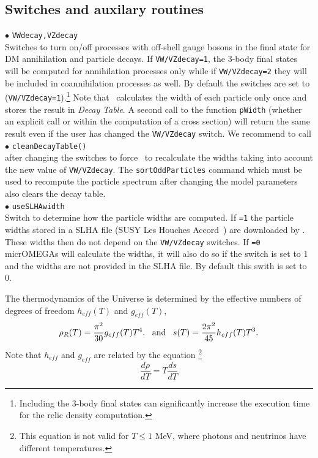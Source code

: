 \documentclass[12pt,a4paper]{article}
\begin{document}
\subsection{Switches and auxilary routines}
\label{Switches}
\noindent
$\bullet$ \verb|VWdecay,VZdecay|\\
Switches to turn on/off  processes with off-shell gauge bosons in the final state for DM annihilation and particle decays.
If \verb|VW/VZdecay=1|, the  3-body final states will be computed for annihilation processes only while 
if \verb|VW/VZdecay=2| they will be included in coannihilation processes as well.
By  default  the switches are set to (\verb|VW/VZdecay=1|).\footnote{Including the 3-body final states can significantly increase the execution time for the relic density computation.}
Note that \micro\ calculates the width of each particle only once and stores the
result in {\it Decay Table}.  A second call to the function \verb|pWidth| (whether an explicit call or within the computation of a cross section)   will return the same result  even if the user has changed the {\tt VW/VZdecay} switch.  
We recommend to call\\[2mm]
$\bullet$ \verb|cleanDecayTable()| \\
after changing the switches to force \micro\ to recalculate the widths taking into account  the new value of {\tt VW/VZdecay}.
The   {\tt sortOddParticles} command which must be used 
to recompute the particle spectrum after changing the model parameters also clears  the decay table.\\[2mm]
%
$\bullet$ \verb|useSLHAwidth|\\
Switch to  determine how the particle widths are computed. 
If {\tt =1} the particle widths  stored in  a SLHA file (SUSY Les Houches Accord~\cite{Skands:2003cj})  are downloaded by \micro. 
These widths  then do not depend on  the {\tt VW/VZdecay} switches. 
If {\tt =0} micrOMEGAs will calculate the widths, it will also do so if the switch is set to 1 and the widths  are not provided in the SLHA file. By default this swith is set to 0. 



The thermodynamics of  the Universe is determined by the effective numbers of degrees of
freedom  $h_{eff}(T)$ and $g_{eff}(T)$, 
\begin{equation}
  \rho_R(T) = \frac{\pi^2}{30} g_{eff}(T) T^4.   \;\;\;  {\rm and}   \;\;\;  s(T)=\frac{2\pi^2}{45} h_{eff}(T) T^3.
\end{equation}Note  that  $h_{eff}$ and  $g_{eff}$ are related by the equation \footnote{ This
equation is not valid for $T\le 1$ MeV, where photons and neutrinos have
different temperatures.}
\begin{equation}
    \frac{d\rho}{dT} = T\frac{d s}{dT}  
\end{equation}
\end{document}
